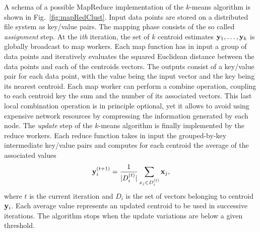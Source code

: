 A schema of a possible MapReduce implementation of the \mbox{$k$-means} algorithm is shown in Fig.~\ref{fig:mapRedClust}. 
Input data points are stored on a distributed file system as key/value pairs. 
The mapping phase consists of the so called \emph{assignment} step. 
At the i\emph{th} iteration, the set of $k$ centroid estimates ${{\bf{y}}_1}, \ldots ,{{\bf{y}}_k}$ is globally broadcast to map workers. 
Each map function has in input a group of data points and iteratively evaluates the squared Euclidean distance between the data points and each of the centroids vectors. 
The outputs consist of a key/value pair for each data point, with the value being the input vector and the key being its nearest centroid. 
Each map worker can perform a combine operation, coupling to each centroid key the sum and the number of its associated vectors.
This last local combination operation is in principle optional, yet it allows to avoid using expensive network resources by compressing the information generated by each node.
The \emph{update} step of the \mbox{$k$-means} algorithm is finally implemented by the reduce workers. 
Each reduce function takes in input the grouped-by-key intermediate key/value pairs and computes for each centroid the average of the associated values
\begin{equation}
	{\bf{y}}_i^{(t + 1)} = \frac{1}{{|D_i^{(t)}|}}\sum\limits_{{x_j} \in D_i^{(t)}} {{{\bf{x}}_j}}  \text{,}
\end{equation}
where $t$ is the current iteration and $D_i$ is the set of vectors belonging to centroid ${\bf{y}}_i$.
Each average value represents an updated centroid to be used in successive iterations. 
The algorithm stops when the update variations are below a given threshold.

